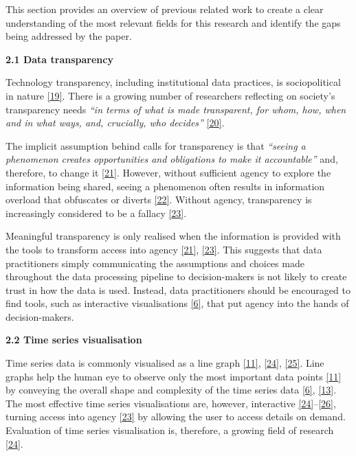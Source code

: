 \documentclass{article}
\begin{document}
This section provides an overview of previous related work to create a
clear understanding of the most relevant fields for this research and
identify the gaps being addressed by the paper.

\textbf{2.1 Data transparency}

Technology transparency, including institutional data practices, is
sociopolitical in nature
\protect\hyperlink{ref-political_transparency}{{[}19{]}}. There is a
growing number of researchers reflecting on society's transparency needs
\emph{``in terms of what is made transparent, for whom, how, when and in
what ways, and, crucially, who decides''}
\protect\hyperlink{ref-social_transparency}{{[}20{]}}.

The implicit assumption behind calls for transparency is that
\emph{``seeing a phenomenon creates opportunities and obligations to
make it accountable''} and, therefore, to change it
\protect\hyperlink{ref-transparency_lack}{{[}21{]}}. However, without
sufficient agency to explore the information being shared, seeing a
phenomenon often results in information overload that obfuscates or
diverts \protect\hyperlink{ref-transparency_obfuscation}{{[}22{]}}.
Without agency, transparency is increasingly considered to be a fallacy
\protect\hyperlink{ref-transparency_fallacy}{{[}23{]}}.

Meaningful transparency is only realised when the information is
provided with the tools to transform access into agency
\protect\hyperlink{ref-transparency_lack}{{[}21{]}},
\protect\hyperlink{ref-transparency_fallacy}{{[}23{]}}. This suggests
that data practitioners simply communicating the assumptions and choices
made throughout the data processing pipeline to decision-makers is not
likely to create trust in how the data is used. Instead, data
practitioners should be encouraged to find tools, such as interactive
visualisations \protect\hyperlink{ref-datapoint}{{[}6{]}}, that put
agency into the hands of decision-makers.

\textbf{2.2 Time series visualisation}

Time series data is commonly visualised as a line graph
\protect\hyperlink{ref-Sveinn}{{[}11{]}},
\protect\hyperlink{ref-timenotes}{{[}24{]}},
\protect\hyperlink{ref-timetuner}{{[}25{]}}. Line graphs help the human
eye to observe only the most important data points
\protect\hyperlink{ref-Sveinn}{{[}11{]}} by conveying the overall shape
and complexity of the time series data
\protect\hyperlink{ref-datapoint}{{[}6{]}},
\protect\hyperlink{ref-downsampling}{{[}13{]}}. The most effective time
series visualisations are, however, interactive
\protect\hyperlink{ref-timenotes}{{[}24{]}}--\protect\hyperlink{ref-plotly}{{[}26{]}},
turning access into agency
\protect\hyperlink{ref-transparency_fallacy}{{[}23{]}} by allowing the
user to access details on demand. Evaluation of time series
visualisation is, therefore, a growing field of research
\protect\hyperlink{ref-timenotes}{{[}24{]}}.
\end{document}
